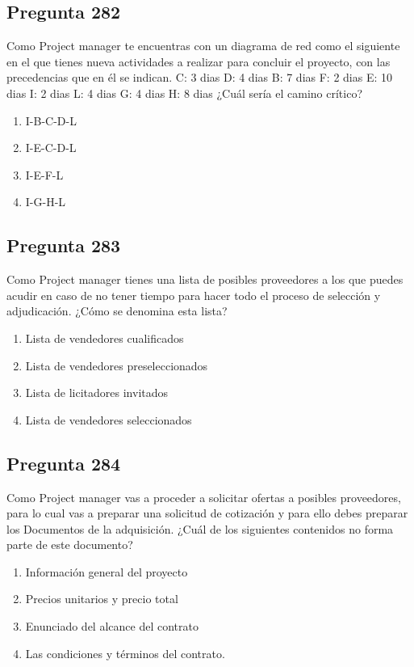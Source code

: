 \documentclass[11pt,a4paper]{article}
\begin{document}
\subsection*{Pregunta 282}
Como Project manager te encuentras con un diagrama de red como el siguiente en el que tienes nueva actividades a realizar para concluir el proyecto, con las precedencias que en él se indican. C: 3 dias D: 4 dias B: 7 dias F: 2 dias E: 10 dias I: 2 dias L: 4 dias G: 4 dias H: 8 dias ¿Cuál sería el camino crítico?

\begin{enumerate}[label=\alph*)]
  \item I-B-C-D-L
  \item I-E-C-D-L
  \item I-E-F-L
  \item I-G-H-L
\end{enumerate}

\subsection*{Pregunta 283}
Como Project manager tienes una lista de posibles proveedores a los que puedes acudir en caso de no tener tiempo para hacer todo el proceso de selección y adjudicación. ¿Cómo se denomina esta lista?

\begin{enumerate}[label=\alph*)]
  \item Lista de vendedores cualificados
  \item Lista de vendedores preseleccionados
  \item Lista de licitadores invitados
  \item Lista de vendedores seleccionados
\end{enumerate}

\subsection*{Pregunta 284}
Como Project manager vas a proceder a solicitar ofertas a posibles proveedores, para lo cual vas a preparar una solicitud de cotización y para ello debes preparar los Documentos de la adquisición. ¿Cuál de los siguientes contenidos no forma parte de este documento?

\begin{enumerate}[label=\alph*)]
  \item Información general del proyecto
  \item Precios unitarios y precio total
  \item Enunciado del alcance del contrato
  \item Las condiciones y términos del contrato.
\end{enumerate}
\end{document}
